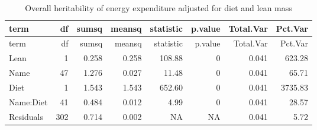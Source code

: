 \documentclass[]{article}
\newenvironment{Shaded}{\begin{snugshade}}{\end{snugshade}}
\newcommand{\DataTypeTok}[1]{\textcolor[rgb]{0.13,0.29,0.53}{#1}}
\newcommand{\DecValTok}[1]{\textcolor[rgb]{0.00,0.00,0.81}{#1}}
\newcommand{\KeywordTok}[1]{\textcolor[rgb]{0.13,0.29,0.53}{\textbf{#1}}}
\newcommand{\NormalTok}[1]{#1}
\newcommand{\OperatorTok}[1]{\textcolor[rgb]{0.81,0.36,0.00}{\textbf{#1}}}
\newcommand{\StringTok}[1]{\textcolor[rgb]{0.31,0.60,0.02}{#1}}
\begin{document}
\begin{Shaded}
\end{Shaded}

\begin{longtable}[]{@{}lrrrrrrr@{}}
\caption{Overall heritability of energy expenditure adjusted for diet
and lean mass}\tabularnewline
\toprule
term & df & sumsq & meansq & statistic & p.value & Total.Var &
Pct.Var\tabularnewline
\midrule
\endfirsthead
\toprule
term & df & sumsq & meansq & statistic & p.value & Total.Var &
Pct.Var\tabularnewline
\midrule
\endhead
Lean & 1 & 0.258 & 0.258 & 108.88 & 0 & 0.041 & 623.28\tabularnewline
Name & 47 & 1.276 & 0.027 & 11.48 & 0 & 0.041 & 65.71\tabularnewline
Diet & 1 & 1.543 & 1.543 & 652.60 & 0 & 0.041 & 3735.83\tabularnewline
Name:Diet & 41 & 0.484 & 0.012 & 4.99 & 0 & 0.041 & 28.57\tabularnewline
Residuals & 302 & 0.714 & 0.002 & NA & NA & 0.041 & 5.72\tabularnewline
\bottomrule
\end{longtable}
\end{document}

